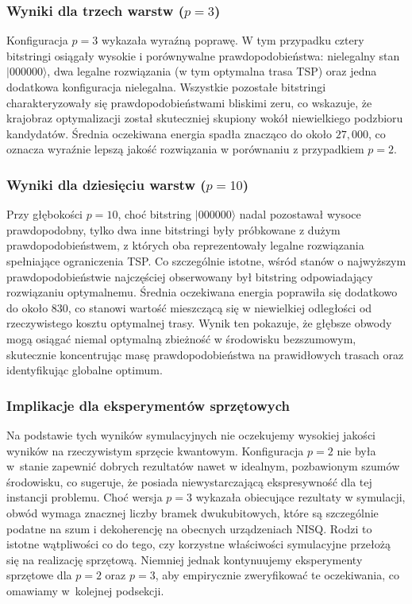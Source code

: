 \subsubsection*{Wyniki dla trzech warstw ($p=3$)}

Konfiguracja $p=3$ wykazała wyraźną poprawę. W tym przypadku cztery bitstringi osiągały wysokie i porównywalne prawdopodobieństwa: nielegalny stan $|000000\rangle$, dwa legalne rozwiązania (w tym optymalna trasa TSP) oraz jedna dodatkowa konfiguracja nielegalna. Wszystkie pozostałe bitstringi charakteryzowały się prawdopodobieństwami bliskimi zeru, co wskazuje, że krajobraz optymalizacji został skuteczniej skupiony wokół niewielkiego podzbioru kandydatów. Średnia oczekiwana energia spadła znacząco do około $27{,}000$, co oznacza wyraźnie lepszą jakość rozwiązania w porównaniu z przypadkiem $p=2$.

\subsubsection*{Wyniki dla dziesięciu warstw ($p=10$)}

Przy głębokości $p=10$, choć bitstring $|000000\rangle$ nadal pozostawał wysoce prawdopodobny, tylko dwa inne bitstringi były próbkowane z dużym prawdopodobieństwem, z których oba reprezentowały legalne rozwiązania spełniające ograniczenia TSP. Co szczególnie istotne, wśród stanów o najwyższym prawdopodobieństwie najczęściej obserwowany był bitstring odpowiadający rozwiązaniu optymalnemu. Średnia oczekiwana energia poprawiła się dodatkowo do około $830$, co stanowi wartość mieszczącą się w niewielkiej odległości od rzeczywistego kosztu optymalnej trasy. Wynik ten pokazuje, że głębsze obwody mogą osiągać niemal optymalną zbieżność w środowisku bezszumowym, skutecznie koncentrując masę prawdopodobieństwa na prawidłowych trasach oraz identyfikując globalne optimum.

\subsubsection*{Implikacje dla eksperymentów sprzętowych}

Na podstawie tych wyników symulacyjnych nie oczekujemy wysokiej jakości wyników na rzeczywistym sprzęcie kwantowym. Konfiguracja $p=2$ nie była w~stanie zapewnić dobrych rezultatów nawet w idealnym, pozbawionym szumów środowisku, co sugeruje, że posiada niewystarczającą ekspresywność dla tej instancji problemu. Choć wersja $p=3$ wykazała obiecujące rezultaty w symulacji, obwód wymaga znacznej liczby bramek dwukubitowych, które są szczególnie podatne na szum i dekoherencję na obecnych urządzeniach NISQ. Rodzi to istotne wątpliwości co do tego, czy korzystne właściwości symulacyjne przełożą się na realizację sprzętową. Niemniej jednak kontynuujemy eksperymenty sprzętowe dla $p=2$ oraz $p=3$, aby empirycznie zweryfikować te oczekiwania, co omawiamy w~kolejnej podsekcji.

